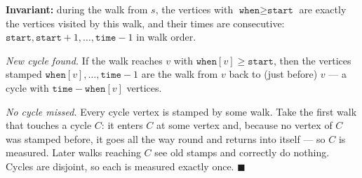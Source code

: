 \begin{invariantbox}
\textbf{Invariant:} during the walk from $s$, the vertices with $\texttt{when} \ge \texttt{start}$ are exactly the vertices visited by this walk, and their times are consecutive: $\texttt{start}, \texttt{start}+1, \dots, \texttt{time}-1$ in walk order.

\emph{New cycle found.} If the walk reaches $v$ with $\texttt{when}[v] \ge \texttt{start}$, then the vertices stamped $\texttt{when}[v], \dots, \texttt{time}-1$ are the walk from $v$ back to (just before) $v$ --- a cycle with $\texttt{time} - \texttt{when}[v]$ vertices.

\emph{No cycle missed.} Every cycle vertex is stamped by some walk. Take the first walk that touches a cycle $C$: it enters $C$ at some vertex and, because no vertex of $C$ was stamped before, it goes all the way round and returns into itself --- so $C$ is measured. Later walks reaching $C$ see old stamps and correctly do nothing. Cycles are disjoint, so each is measured exactly once. \hfill$\blacksquare$
\end{invariantbox}

